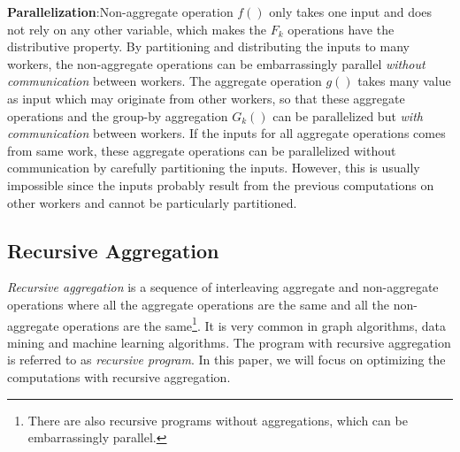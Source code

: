 
\textbf{Parallelization}:Non-aggregate operation $f()$ only takes one input and does not rely on any other variable, which makes the $F_k$ operations have the distributive property. By partitioning and distributing the inputs to many workers, the non-aggregate operations can be embarrassingly parallel \emph{without communication} between workers. The aggregate operation $g()$ takes many value as input which may originate from other workers, so that these aggregate operations and the group-by aggregation $G_k()$ can be parallelized but \emph{with communication} between workers. If the inputs for all aggregate operations comes from same work, these aggregate operations can be parallelized without communication by carefully partitioning the inputs. However, this is usually impossible since the inputs probably result from the previous computations on other workers and cannot be particularly partitioned.



\subsection{Recursive Aggregation}


\emph{Recursive aggregation} is a sequence of interleaving aggregate and non-aggregate operations where all the aggregate operations are the same and all the non-aggregate operations are the same\footnote{There are also recursive programs without aggregations, which can be embarrassingly parallel.}. It is very common in graph algorithms, data mining and machine learning algorithms. The program with recursive aggregation is referred to as \emph{recursive program}. In this paper, we will focus on optimizing the computations with recursive aggregation.


